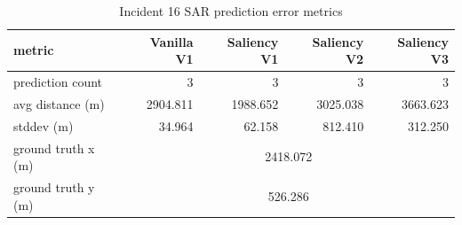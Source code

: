 \begin{table}[ht]
\centering
\caption{Incident 16 SAR prediction error metrics}
\label{tab:sar-incident-16}
\begin{tabular}{lrrrr}
\hline
metric & Vanilla V1 & Saliency V1 & Saliency V2 & Saliency V3 \\
\hline
prediction count & 3 & 3 & 3 & 3 \\
avg distance (m) & 2904.811 & 1988.652 & 3025.038 & 3663.623 \\
stddev (m) & 34.964 & 62.158 & 812.410 & 312.250 \\
ground truth x (m) & \multicolumn{4}{c}{2418.072} \\
ground truth y (m) & \multicolumn{4}{c}{526.286} \\
\hline
\end{tabular}
\end{table}
